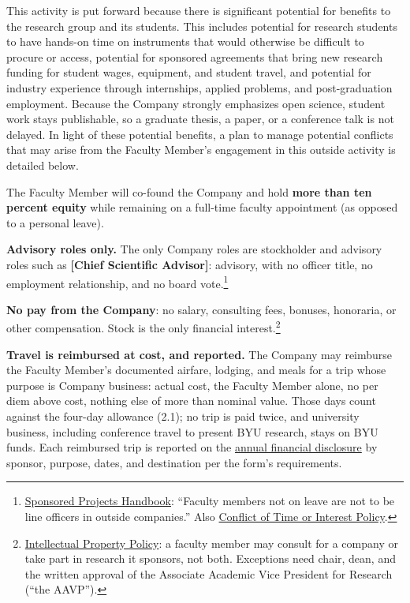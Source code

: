 \documentclass[11pt]{article}
\begin{document}
This activity is put forward because
there is significant potential for benefits to the research group and its students. This includes potential for research students
to have hands-on time on instruments that would otherwise be difficult to procure or access, potential for sponsored agreements that bring new research funding for
student wages, equipment, and student travel, and potential for industry experience through internships, applied problems, and post-graduation employment. Because the Company strongly emphasizes open science, student work stays publishable, so
a graduate thesis, a paper, or a conference talk is not delayed. In light of these potential benefits, a plan to manage potential conflicts that may arise from the Faculty Member's engagement in this outside activity is detailed below.


 The Faculty Member will co-found the Company and hold \textbf{more
than ten percent equity} while remaining on a full-time
faculty appointment (as opposed to a personal leave).

 \textbf{Advisory roles only.} The only Company roles are
stockholder and advisory roles such as \textbf{[Chief Scientific Advisor]}: advisory, with no officer
title, no employment relationship, and no board vote.\footnote{\href{https://finserve.byu.edu/00000193-6566-d995-a9db-eff6a47a0001/sponsored-programs-handbook}{Sponsored
Projects Handbook}: ``Faculty members not on leave are not to be line officers
in outside companies.'' Also
\href{https://policy.byu.edu/view/conflict-of-time-or-interest-policy}{Conflict
of Time or Interest Policy}.}

 \textbf{No pay from the Company}: no salary, consulting fees,
bonuses, honoraria, or other compensation. Stock is the only financial
interest.\footnote{\href{https://policy.byu.edu/view/intellectual-property-policy}{Intellectual
Property Policy}: a faculty member may consult for a company or take part in
research it sponsors, not both. Exceptions need chair, dean, and the written
approval of the Associate Academic Vice President for Research (``the AAVP'').}

 \textbf{Travel is reimbursed at cost, and reported.} The Company
may reimburse the Faculty Member's documented airfare, lodging, and meals for
a trip whose purpose is Company business: actual cost, the Faculty Member
alone, no per diem above cost, nothing else of more than nominal value. Those days count against the four-day allowance (2.1); no trip
is paid twice, and university business, including conference travel to present
BYU research, stays on BYU funds. Each reimbursed trip is reported on the
\href{https://spo.byu.edu/policies}{annual financial disclosure} by sponsor,
purpose, dates, and destination per the form's requirements.
\end{document}
